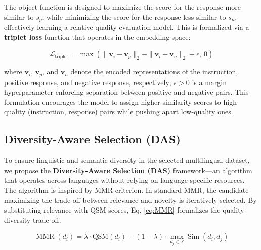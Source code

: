 \documentclass[sigconf]{acmart}
\begin{document}
The object function is designed to maximize the score for the response more similar to $s_p$, while minimizing the score for the response less similar to $s_n$, effectively learning a relative quality evaluation model. This is formalized via a \textbf{triplet loss} function that operates in the embedding space:

\begin{displaymath}
\mathcal{L}_{\text{triplet}} = \max \left( \| \mathbf{v}_i - \mathbf{v}_p \|_2 - \| \mathbf{v}_i - \mathbf{v}_n \|_2 + \epsilon,\ 0 \right)
\end{displaymath}

where $\mathbf{v}_i$, $\mathbf{v}_p$, and $\mathbf{v}_n$ denote the encoded representations of the instruction, positive response, and negative response, respectively; $\epsilon > 0$ is a margin hyperparameter enforcing separation between positive and negative pairs. This formulation encourages the model to assign higher similarity scores to high-quality (instruction, response) pairs while pushing apart low-quality ones.

\subsection{Diversity-Aware Selection (DAS)} \label{method_DAS}

To ensure linguistic and semantic diversity in the selected multilingual dataset, we propose the \textbf{Diversity-Aware Selection (DAS)} framework---an algorithm that operates across languages without relying on language-specific resources. The algorithm is inspired by MMR criterion. In standard MMR, the candidate maximizing the trade-off between relevance and novelty is iteratively selected. By substituting relevance with QSM scores, Eq. \ref{eq:MMR} formalizes the quality-diversity trade-off. 

\begin{equation} \label{eq:MMR}
    \operatorname{MMR}(d_i) = \lambda \cdot \text{QSM}(d_i) - (1 - \lambda) \cdot \max_{d_j \in \mathcal{S}} \operatorname{Sim}(d_i, d_j)
\end{equation}
\end{document}
